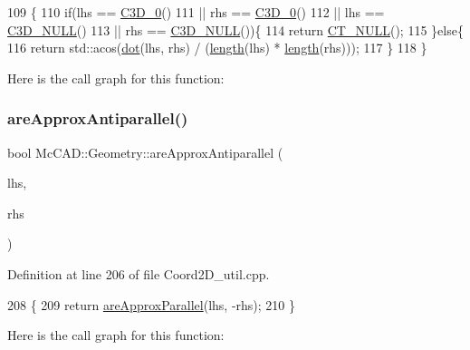 \begin{DoxyCode}
109                            \{
110     \textcolor{keywordflow}{if}(lhs == \hyperlink{namespaceMcCAD_1_1Geometry_a93fd5c6be0d76b39b101166f54da0a47}{C3D\_0}()
111             || rhs == \hyperlink{namespaceMcCAD_1_1Geometry_a93fd5c6be0d76b39b101166f54da0a47}{C3D\_0}()
112             || lhs == \hyperlink{namespaceMcCAD_1_1Geometry_ae08bc63c64f6c022b784d73e474724f3}{C3D\_NULL}()
113             || rhs == \hyperlink{namespaceMcCAD_1_1Geometry_ae08bc63c64f6c022b784d73e474724f3}{C3D\_NULL}())\{
114         \textcolor{keywordflow}{return} \hyperlink{namespaceMcCAD_1_1Geometry_a7a1a1f1e3e0547cde4d81dec1a126c28}{CT\_NULL}();
115     \}\textcolor{keywordflow}{else}\{
116         \textcolor{keywordflow}{return} std::acos(\hyperlink{namespaceMcCAD_1_1Geometry_a3115a59f432b3fc11f4bac6ee17d979b}{dot}(lhs, rhs) / (\hyperlink{namespaceMcCAD_1_1Geometry_ad2997914c766f1fc561cdd30032b6777}{length}(lhs) * \hyperlink{namespaceMcCAD_1_1Geometry_ad2997914c766f1fc561cdd30032b6777}{length}(rhs)));
117     \}
118 \}
\end{DoxyCode}
Here is the call graph for this function\+:
\mbox{\label{namespaceMcCAD_1_1Geometry_a7bca12a64777ad23b8f76b31abd4aefb}} 
\subsubsection{\texorpdfstring{are\+Approx\+Antiparallel()}{areApproxAntiparallel()}\hspace{0.1cm}{\footnotesize\ttfamily [1/2]}}
{\footnotesize\ttfamily bool Mc\+C\+A\+D\+::\+Geometry\+::are\+Approx\+Antiparallel (\begin{DoxyParamCaption}\item[{const \hyperlink{classMcCAD_1_1Geometry_1_1Coord2D}{Coord2D} \&}]{lhs,  }\item[{const \hyperlink{classMcCAD_1_1Geometry_1_1Coord2D}{Coord2D} \&}]{rhs }\end{DoxyParamCaption})}



Definition at line 206 of file Coord2\+D\+\_\+util.\+cpp.


\begin{DoxyCode}
208                            \{
209     \textcolor{keywordflow}{return} \hyperlink{namespaceMcCAD_1_1Geometry_a5f22eddbae2e5a4f839f409d20d54330}{areApproxParallel}(lhs, -rhs);
210 \}
\end{DoxyCode}
Here is the call graph for this function\+:
\mbox{\label{namespaceMcCAD_1_1Geometry_a217e83a743aba0da9831e8f6fca5b44b}} 

